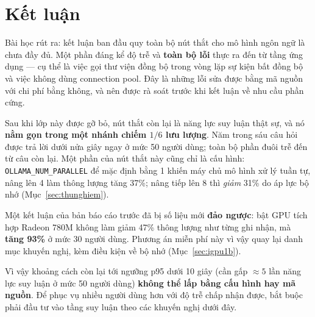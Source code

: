 \documentclass[12pt,a4paper]{article}
\begin{document}
\section{Kết luận}

\begin{center}
\setlength{\fboxsep}{6pt}
\end{center}

Bài học rút ra: kết luận ban đầu quy toàn bộ nút thắt cho mô hình ngôn ngữ là chưa
đầy đủ. Một phần đáng kể độ trễ và \textbf{toàn bộ lỗi} thực ra đến từ tầng ứng
dụng --- cụ thể là việc gọi thư viện đồng bộ trong vòng lặp sự kiện bất đồng bộ và
việc không dùng connection pool. Đây là những lỗi sửa được bằng mã nguồn với chi
phí bằng không, và nên được rà soát trước khi kết luận về nhu cầu phần cứng.

Sau khi lớp này được gỡ bỏ, nút thắt còn lại là năng lực suy luận thật sự, và nó
\textbf{nằm gọn trong một nhánh chiếm $1/6$ lưu lượng}. Năm trong sáu câu hỏi được
trả lời dưới nửa giây ngay ở mức 50 người dùng; toàn bộ phần đuôi trễ đến từ câu
còn lại. Một phần của nút thắt này cũng chỉ là cấu hình:
\texttt{OLLAMA\_NUM\_PARALLEL} để mặc định bằng 1 khiến máy chủ mô hình xử lý tuần
tự, nâng lên 4 làm thông lượng tăng 37\%; nâng tiếp lên 8 thì \emph{giảm} 31\% do
áp lực bộ nhớ (Mục~\ref{sec:thunghiem}).

Một kết luận của bản báo cáo trước đã bị số liệu mới \textbf{đảo ngược}: bật GPU
tích hợp Radeon 780M không làm giảm 47\% thông lượng như từng ghi nhận, mà
\textbf{tăng 93\%} ở mức 30 người dùng. Phương án miễn phí này vì vậy quay lại
danh mục khuyến nghị, kèm điều kiện về bộ nhớ (Mục~\ref{sec:igpu1b}).

Vì vậy khoảng cách còn lại tới ngưỡng p95 dưới 10 giây (cần gấp $\approx 5$ lần
năng lực suy luận ở mức 50 người dùng) \textbf{không thể lấp bằng cấu hình hay mã
nguồn}. Để phục vụ nhiều người dùng hơn với độ trễ chấp nhận được, bắt buộc phải
đầu tư vào tầng suy luận theo các khuyến nghị dưới đây.
\end{document}
